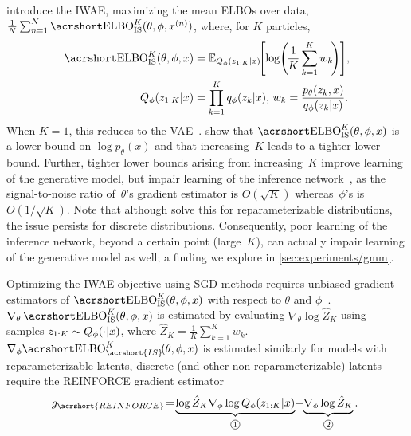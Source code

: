 \citet{burda2016importance} introduce the \gls{IWAE}, maximizing the mean \glspl{ELBO} over data, $\frac{1}{N} \sum_{n = 1}^N \ELBO_{\text{IS}}^K(\theta, \phi, x^{(n)})$, where, for $K$ particles,
\begin{align}
  \label{eq:elbo_is}
  \ELBO_{\text{IS}}^K(\theta, \phi, x)
  &= \E_{Q_\phi(z_{1:K} \given x)}
    \!\!\left[ \log\!\left(\!\frac{1}{K} \sum_{k = 1}^K w_k \!\right)\right]\!,\\
  Q_\phi(z_{1:K} \given x)
  &= \prod_{k = 1}^K q_\phi(z_k \given x), \,w_k = \frac{p_\theta(z_k, x)}{q_\phi(z_k \given x)}.
  \nonumber
\end{align}
When $K = 1$, this reduces to the \gls{VAE}~\citep{kingma2014auto,rezende2014stochastic}.
\citet{burda2016importance} show that $\ELBO_{\text{IS}}^K(\theta, \phi, x)$ is a lower bound on $\log p_\theta(x)$ and that increasing~$K$ leads to a tighter lower bound.
%
Further, tighter lower bounds arising from increasing~$K$ improve learning of the generative model, but impair learning of the inference network~\citep{rainforth2018tighter}, as the signal-to-noise ratio of~\(\theta\)'s gradient estimator is $O(\sqrt{K})$ whereas~\(\phi\)'s is $O(1 / \sqrt{K})$.
%
Note that although \citet{tucker2019doubly} solve this for reparameterizable distributions, the issue persists for discrete distributions.
%
Consequently, poor learning of the inference network, beyond a certain point (large~\(K\)), can actually impair learning of the generative model as well; a finding we explore in \cref{sec:experiments/gmm}.

Optimizing the \gls{IWAE} objective using \gls{SGD} methods requires unbiased gradient estimators of $\ELBO_{\text{IS}}^K(\theta, \phi, x)$ with respect to $\theta$ and $\phi$~\citep{robbins1951stochastic}.
%
$\nabla_\theta \ELBO_{\text{IS}}^K(\theta, \phi, x)$ is estimated by evaluating $\nabla_\theta \log \hat Z_K$ using samples $z_{1:K} \sim Q_\phi(\cdot \lvert x)$, where $\hat Z_K = \frac{1}{K} \sum_{k = 1}^K\! w_k$.
$\nabla_\phi \!\ELBO_{\acrshort{IS}}^K\!(\theta, \phi, x)$ is estimated similarly for models with reparameterizable latents, discrete (and other non-reparameterizable) latents require the \acrshort{REINFORCE} gradient estimator~\citep{williams1992simple}
\begin{align}
  \!\!\!\!g_{\acrshort{REINFORCE}}
  \!=\! \underbrace{\log \hat Z_K \nabla_\phi \log Q_\phi(z_{1:K} \given x)}_{\circled[5]{1}}
  \!+\! \underbrace{\nabla_\phi \log \hat Z_K}_{\circled[5]{2}}.\!\!
    \label{eq:iwae-reinforce}
\end{align}

